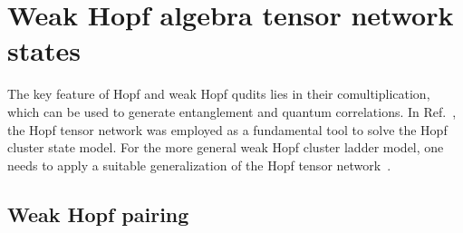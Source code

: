 \documentclass[a4paper,11pt]{article}
\theoremstyle{theorem}
\newtheorem{example}{Example}
\theoremstyle{remark}
\newcommand{\Av}{\mathbb{A}}
\newcommand{\Bf}{\mathbb{B}}
\newcommand{\XR}{\overset{\rightarrow}{X}}
\newcommand{\XL}{\overset{\leftarrow}{X}}
\newcommand{\ZL}{\overset{\leftarrow}{Z}}
\newcommand{\cone}{(1)}
\newcommand{\ctwo}{(2)}
\begin{document}



	
\section{Weak Hopf algebra tensor network states}
\label{sec:tensor-network}


The key feature of Hopf and weak Hopf qudits lies in their comultiplication, which can be used to generate entanglement and quantum correlations. In Ref.~\cite{jia2024generalized}, the Hopf tensor network was employed as a fundamental tool to solve the Hopf cluster state model. For the more general weak Hopf cluster ladder model, one needs to apply a suitable generalization of the Hopf tensor network~\cite{jia2024generalized,Jia2023weak,jia2023boundary,girelli2021semidual,Buerschaper2013a}.  


\subsection{Weak Hopf pairing}
\end{document}
